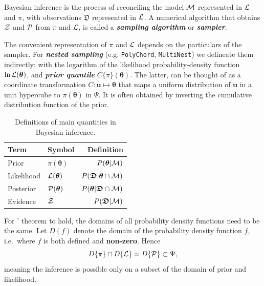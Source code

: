 \documentclass[usenatbib]{mnras}
\begin{document}
Bayesian inference is the process of reconciling the model ${\cal M}$
represented in ${\cal L}$ and $\pi$, with observations
\(\mathfrak{D}\) represented in ${\cal L}$. A numerical algorithm that
obtains ${\cal Z}$ and ${\cal P}$ from $\pi$ and ${\cal L}$, is called
a \textbf{\emph{sampling algorithm}} or \textbf{\emph{sampler}}.

The convenient representation of $\pi$ and ${\cal L}$ depends on the
particulars of the sampler. For \textbf{\emph{nested sampling}}
(e.g. \texttt{PolyChord}, \texttt{MultiNest}) we delineate them
indirectly: with the logarithm of the likelihood probability-density
function \(\ln \cal L (\bm{\theta})\), and \textbf{\emph{prior
    quantile}} \(C\{\pi\}(\bm{\theta})\). The latter, can be thought
of as a coordinate transformation $C: \bm{u} \mapsto \bm{\theta}$ that
maps a uniform distribution of $\bm{u}$ in a unit hypercube to
$\pi(\bm{\theta})$ in $\Psi$. It is often obtained by inverting the
cumulative distribution function of the prior.

\begin{table}
  \caption{Definitions of main quantities in Bayesian inference.   \label{tab:defs}}
\centering
\begin{tabular}{llr}
\textbf{\textbf{Term}} & \textbf{\textbf{Symbol}} & \textbf{\textbf{Definition}}\\
\hline
  Prior  & \(\pi(\bm{\theta})\) & \(P ( \bm{\theta}  \vert {\cal M})\) \\
  Likelihood  & \({\cal L}(\bm{\theta})\) & \(P ( \bm{\mathfrak{D}} \vert \bm{\theta} \cap {\cal M})\) \\
  Posterior  & \({\cal P}(\bm{\theta})\) & \(P ( \bm{\theta} \vert \bm{\mathfrak{D}} \cap {\cal M})\) \\
Evidence & \({\cal Z}\) & \(P ( \bm{\mathfrak{D}} \vert {\cal M})\) \\
\end{tabular}
\end{table}


For \citeauthor{1763}' theorem to hold, the domains of all probability
density functions need to be the same. Let \(D(f)\) denote the domain
of the probability density function \(f\), i.e.~where \(f\) is both
defined and \textbf{non-zero}. Hence
\begin{equation}
  D \{ \pi \} \cap D \{ {\cal L} \} = D \{ {\cal P} \} \subset \Psi,
\end{equation} 
meaning the inference is possible only on a subset of the domain of
prior and likelihood.\label{domain-discussion}
\end{document}
